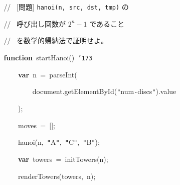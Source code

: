 \documentclass[a4paper,10pt]{article}
\def\mc{\relax}
\begin{document}
\noindent
\mbox{}{\tt\mc \ }{\tt\mc \ }{\tt\mc \ }{\tt\mc \ }{\tt\mc \ }{\tt\mc \ }{\tt\mc \ }{\tt\mc \ }\rm\mc // \ [問題] {\tt hanoi(n, src, dst, tmp)} の
\tt\mc 

\noindent
\mbox{}{\tt\mc \ }{\tt\mc \ }{\tt\mc \ }{\tt\mc \ }{\tt\mc \ }{\tt\mc \ }{\tt\mc \ }{\tt\mc \ }\rm\mc // \    呼び出し回数が $2^n - 1$ であること \hfill
\tt\mc 

\noindent
\mbox{}{\tt\mc \ }{\tt\mc \ }{\tt\mc \ }{\tt\mc \ }{\tt\mc \ }{\tt\mc \ }{\tt\mc \ }{\tt\mc \ }\rm\mc // \ を数学的帰納法で証明せよ。\hfill
\tt\mc 

\noindent
\mbox{}{\tt\mc \ }{\tt\mc \ }{\tt\mc \ }{\tt\mc \ }{\tt\mc \ }{\tt\mc \ }{\tt\mc \ }{\tt\mc \ }\textbf{function}{\tt\mc \ }startHanoi(){\tt\mc \ }{\tt\char'173}

\noindent
\mbox{}{\tt\mc \ }{\tt\mc \ }{\tt\mc \ }{\tt\mc \ }{\tt\mc \ }{\tt\mc \ }{\tt\mc \ }{\tt\mc \ }{\tt\mc \ }{\tt\mc \ }{\tt\mc \ }{\tt\mc \ }\textbf{var}{\tt\mc \ }n{\tt\mc \ }={\tt\mc \ }parseInt(

\noindent
\mbox{}{\tt\mc \ }{\tt\mc \ }{\tt\mc \ }{\tt\mc \ }{\tt\mc \ }{\tt\mc \ }{\tt\mc \ }{\tt\mc \ }{\tt\mc \ }{\tt\mc \ }{\tt\mc \ }{\tt\mc \ }{\tt\mc \ }{\tt\mc \ }{\tt\mc \ }{\tt\mc \ }document.getElementById({\tt "}num{\tt -}discs{\tt "}).value

\noindent
\mbox{}{\tt\mc \ }{\tt\mc \ }{\tt\mc \ }{\tt\mc \ }{\tt\mc \ }{\tt\mc \ }{\tt\mc \ }{\tt\mc \ }{\tt\mc \ }{\tt\mc \ }{\tt\mc \ }{\tt\mc \ });

\noindent
\mbox{}{\tt\mc \ }{\tt\mc \ }{\tt\mc \ }{\tt\mc \ }{\tt\mc \ }{\tt\mc \ }{\tt\mc \ }{\tt\mc \ }{\tt\mc \ }{\tt\mc \ }{\tt\mc \ }{\tt\mc \ }moves{\tt\mc \ }={\tt\mc \ }[];

\noindent
\mbox{}{\tt\mc \ }{\tt\mc \ }{\tt\mc \ }{\tt\mc \ }{\tt\mc \ }{\tt\mc \ }{\tt\mc \ }{\tt\mc \ }{\tt\mc \ }{\tt\mc \ }{\tt\mc \ }{\tt\mc \ }hanoi(n,{\tt\mc \ }{\tt "}A{\tt "},{\tt\mc \ }{\tt "}C{\tt "},{\tt\mc \ }{\tt "}B{\tt "});

\noindent
\mbox{}\hfill

\noindent
\mbox{}{\tt\mc \ }{\tt\mc \ }{\tt\mc \ }{\tt\mc \ }{\tt\mc \ }{\tt\mc \ }{\tt\mc \ }{\tt\mc \ }{\tt\mc \ }{\tt\mc \ }{\tt\mc \ }{\tt\mc \ }\textbf{var}{\tt\mc \ }towers{\tt\mc \ }={\tt\mc \ }initTowers(n);

\noindent
\mbox{}{\tt\mc \ }{\tt\mc \ }{\tt\mc \ }{\tt\mc \ }{\tt\mc \ }{\tt\mc \ }{\tt\mc \ }{\tt\mc \ }{\tt\mc \ }{\tt\mc \ }{\tt\mc \ }{\tt\mc \ }renderTowers(towers,{\tt\mc \ }n);
\end{document}
